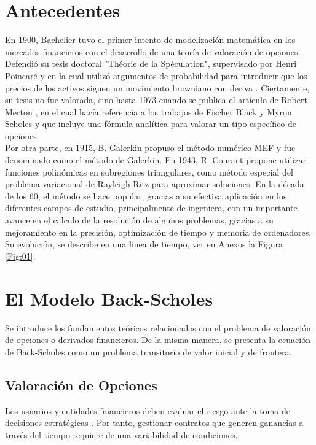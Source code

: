 \documentclass[12pt]{article}
\begin{document}
\section*{Antecedentes}
En 1900, Bachelier tuvo el primer intento de modelización matemática en los mercados financieros con el desarrollo de una teoría de valoración de opciones \cite{Art03}. Defendió su tesis doctoral "Théorie de la Spéculation", supervisado por Henri Poincaré y en la cual  utilizó argumentos de probabilidad para introducir que los precios de los activos siguen un movimiento browniano con deriva \cite{Lib02}. Ciertamente, su tesis no fue valorada, sino hasta 1973 cuando se publica el artículo de Robert Merton \cite{Lib06}, en el cual hacía referencia a los trabajos de Fischer Black y Myron Scholes \cite{Lib05} y que incluye una fórmula analítica para valorar un tipo específico de opciones.\\

Por otra parte, en 1915, B. Galerkin propuso el método numérico MEF y fue denominado como el método de Galerkin. En 1943, R. Courant propone utilizar funciones polinómicas en subregiones triangulares, como método especial del problema variacional de Rayleigh-Ritz para aproximar soluciones. En la década de los 60, el método  se hace popular, gracias a su efectiva aplicación en los diferentes campos de estudio, principalmente de ingeniera, con un importante avance en el calculo de la resolución de algunos problemas, gracias a su mejoramiento en la precisión, optimización de tiempo y memoria de ordenadores. Su evolución,  se describe en una linea de tiempo, ver en Anexos la Figura \ref{Fig:01}. 
  
\section{El Modelo Back-Scholes}\label{Sec:01}
Se introduce los fundamentos teóricos relacionados con el problema de valoración de opciones o derivados financieros. De la misma manera, se presenta la ecuación de Back-Scholes como un problema transitorio de valor inicial y de frontera.\\

\subsection{Valoración de Opciones}
Los usuarios y entidades financieros deben evaluar el riesgo ante la toma de decisiones estratégicas \cite{Art01}. Por tanto, gestionar contratos que generen ganancias a través del tiempo requiere de una variabilidad de condiciones. 
\end{document}
